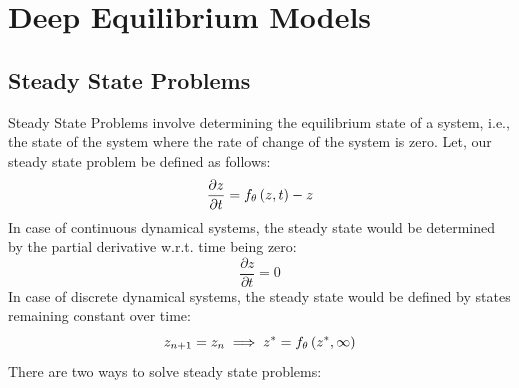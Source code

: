 \chapter{Deep Equilibrium Models}
\label{chapter:deep_equilibrium_models}

\section{Steady State Problems}
\label{sec:steady_state_problems}

Steady State Problems involve determining the equilibrium state of a system, i.e., the state of the system where the rate of change of the system is zero. Let, our steady state problem be defined as follows:
%
\begin{equation}
  \frac{\partial z}{\partial t} = f_\theta\left(z, t\right) - z
\end{equation}
%
In case of continuous dynamical systems, the steady state would be determined by the partial derivative w.r.t. time being zero:
%
\begin{equation}
  \frac{\partial z}{\partial t} = 0
\end{equation}
%
In case of discrete dynamical systems, the steady state would be defined by states remaining constant over time:
%
\begin{equation}
  z_{n + 1} = z_n \implies z^* = f_\theta\left(z^*, \infty\right)
\end{equation}
%
There are two ways to solve steady state problems:
%
